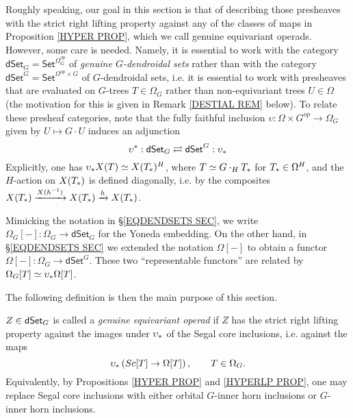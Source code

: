 \documentclass[a4paper,10pt
,draft
]{article}%
\begin{document}
Roughly speaking, our goal in this section is that of describing those presheaves with the 
strict right lifting property against any of the classes of maps in Proposition \ref{HYPER PROP},
which we call genuine equivariant operads.
However, some care is needed.
Namely, it is essential to work with the category
$\mathsf{dSet}_G = \mathsf{Set}^{\Omega_G^{op}}$
of \textit{genuine $G$-dendroidal sets}
rather than with the category
$\mathsf{dSet}^G = \mathsf{Set}^{\Omega^{op} \times G}$
of $G$-dendroidal sets, i.e. it is essential to work with presheaves that are evaluated on 
$G$-trees $T \in \Omega_G$
rather than non-equivariant trees $U \in \Omega$
(the motivation for this is given in 
Remark \ref{DESTIAL REM} below).
To relate these presheaf categories, note that the fully faithful inclusion
$\upsilon \colon \Omega \times G^{op} \to \Omega_G$
given by $U \mapsto G \cdot U$ induces an adjunction
\begin{equation}\label{DSETG_EQ}
	\upsilon^{\**}: \dSet_G \rightleftarrows \dSet^G : \upsilon_{\**}
\end{equation}
Explicitly, one has 
$\upsilon_{\**}X(T) \simeq X(T_{\**})^H$,
where $T \simeq G \cdot_H T_{\**}$ for 
$T_{\**} \in \Omega^H$,
and the $H$-action on 
$X(T_{\**})$ is defined diagonally, i.e. by the composites
$X(T_{\**}) \xrightarrow{X(h^{-1})}
X(T_{\**}) \xrightarrow{h} X(T_{\**})$.


\begin{remark}
Mimicking the notation in \S \ref{EQDENDSETS SEC},
we write $\Omega_G[-] \colon \Omega_G \to \mathsf{dSet}_G$
for the Yoneda embedding.
On the other hand, in 
\S \ref{EQDENDSETS SEC} we extended the notation $\Omega[-]$
to obtain a functor $\Omega[-] \colon \Omega_G \to \mathsf{dSet}^G$.
These two ``representable functors'' are related by 
$\Omega_G[T] \simeq \upsilon_{\**} \Omega[T]$.
\end{remark}

The following definition is then the main purpose of this section.


\begin{definition}\label{GEN_OP_DEF}
	$Z \in \mathsf{dSet}_G$ is called a \textit{genuine equivariant operad} if
	$Z$ has the strict right lifting property against the images under $\upsilon_{\**}$
	of the Segal core inclusions, i.e. against the maps
	\begin{equation}\label{GGIOP_EQ}
		\upsilon_{\**}\left(Sc[T] \to \Omega[T] \right),
		\qquad
		T \in \Omega_G.
	\end{equation}
Equivalently, by Propositions \ref{HYPER PROP} and \ref{HYPERLP PROP}, one may replace Segal core inclusions with either orbital $G$-inner horn inclusions or $G$-inner horn inclusions.
\end{definition}
\end{document}
